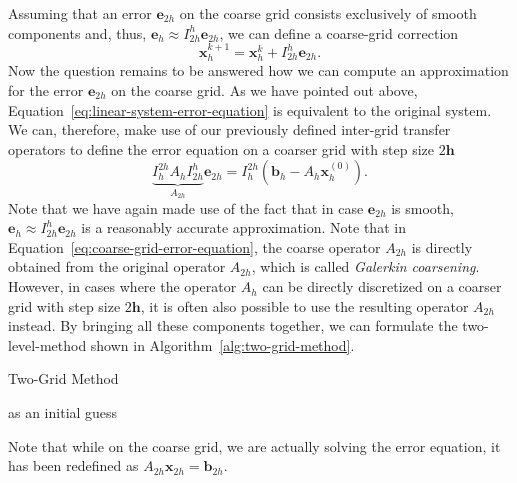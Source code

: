 Assuming that an error $\bm{e}_{2h}$ on the coarse grid consists exclusively of smooth components and, thus, $\bm{e}_{h} \approx I_{2h}^{h} \bm{e}_{2h}$, we can define a coarse-grid correction 
\begin{equation}
	\bm{x}^{k+1}_h = \bm{x}^{k}_h + I_{2h}^h \bm{e}_{2h}.
\end{equation} 
Now the question remains to be answered how we can compute an approximation for the error $\bm{e}_{2h}$ on the coarse grid.
As we have pointed out above, Equation~\eqref{eq:linear-system-error-equation} is equivalent to the original system.
We can, therefore, make use of our previously defined inter-grid transfer operators to define the error equation on a coarser grid with step size $2\bm{h}$
\begin{equation}
	\underbrace{I_{h}^{2h} A_h I_{2h}^h}_{A_{2h}} \bm{e}_{2h} = I_{h}^{2h} \left(\bm{b}_h - A_h \bm{x}^{(0)}_h\right).
	\label{eq:coarse-grid-error-equation}
\end{equation}
Note that we have again made use of the fact that in case $\bm{e}_{2h}$ is smooth, $\bm{e}_{h} \approx I_{2h}^{h} \bm{e}_{2h}$ is a reasonably accurate approximation.
Note that in Equation~\eqref{eq:coarse-grid-error-equation}, the coarse operator $A_{2h}$ is directly obtained from the original operator $A_{2h}$, which is called \emph{Galerkin coarsening}.
However, in cases where the operator $A_h$ can be directly discretized on a coarser grid with step size $2\bm{h}$, it is often also possible to use the resulting operator $A_{2h}$ instead.
By bringing all these components together, we can formulate the two-level-method shown in Algorithm~\ref{alg:two-grid-method}.
\begin{algorithm}
	\caption{Two-Grid Method}
	\label{alg:two-grid-method}
	\begin{algorithmic}
		 as an initial guess
	\end{algorithmic}
\end{algorithm}
Note that while on the coarse grid, we are actually solving the error equation, it has been redefined as $A_{2h} \bm{x}_{2h} = \bm{b}_{2h}$.
